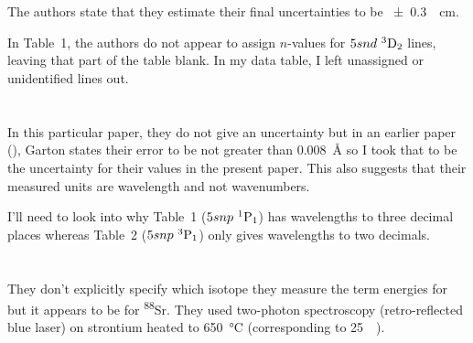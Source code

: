 \documentclass{article}
\newcommand{\tsup}{\textsuperscript}													%
\newcommand{\tsub}{\textsubscript}														%
\newcommand{\Sr}[1]{\tsup{#1}\textnormal{Sr}}											%
\newcommand{\SLJ}[3]{\tsup{#1}\textnormal{#2}\tsub{#3}}
\newcommand{\nSLJ}[4]{{#1}\textnormal{ }\SLJ{#2}{#3}{#4}}
\begin{document}
\section{}

The authors state that they estimate their final uncertainties to be \SI{\pm 0.3}{\per\cm}. 

In Table~1, the authors do not appear to assign $n$-values for $\nSLJ{5snd}{3}{D}{2}$ lines, leaving that part of the table blank. In my data table, I left unassigned or unidentified lines out.

\section{}

In this particular paper, they do not give an uncertainty but in an earlier paper (\cite{gaw_1966}), Garton states their error to be not greater than \SI{0.008}{\angstrom} so I took that to be the uncertainty for their values in the present paper. This also suggests that their measured units are wavelength and not wavenumbers.

I'll need to look into why Table~1 ($\nSLJ{5snp}{1}{P}{1}$) has wavelengths to three decimal places whereas Table~2 ($\nSLJ{5snp}{3}{P}{1}$) only gives wavelengths to two decimals. 

\section{}

They don't explicitly specify which isotope they measure the term energies for but it appears to be for \Sr{88}. They used two-photon spectroscopy (retro-reflected blue laser) on strontium heated to \SI{650}{\celsius} (corresponding to \SI{25}{\milli\Torr}). 

\section{}

\section{}

\section{}

\section{}
 
\printbibliography
\end{document}
